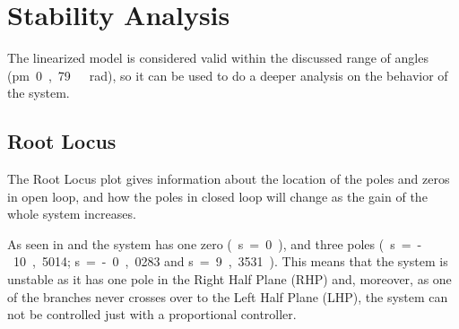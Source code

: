 \section{Stability Analysis}\label{sec:stabilityAnalysis}
The linearized model is considered valid within the discussed range of angles (\si{\pm 0,79\ rad}), so it can be used to do a deeper analysis on the behavior of the system. %
%
%
%
%

\subsection{Root Locus}
The Root Locus plot gives information about the location of the poles and zeros in open loop, and how the poles in closed loop will change as the gain of the whole system increases.

As seen in  and  the system has one zero \si{(s=0)}, and three poles \si{(s=-10,5014}; \si{s=-0,0283} and \si{s=9,3531)}. This means that the system is unstable as it has one pole in the Right Half Plane (RHP) and, moreover, as one of the branches never crosses over to the Left Half Plane (LHP), the system can not be controlled just with a proportional controller.
\vspace{-18pt}

